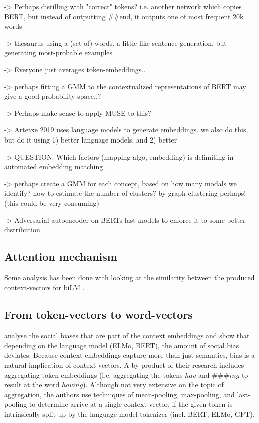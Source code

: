 \documentclass[a4paper,12pt,twoside,openright]{report}
\begin{document}
-> Perhaps distilling with "correct" tokens? i.e. another network which copies BERT, but instead of outputting \#\#end, it outputs one of most frequent 20k words

-> thesaurus using a (set of) words. a little like sentence-generation, but generating most-probable examples

-> Everyone just averages token-embeddings..

-> perhaps fitting a GMM to the contextualized representations of BERT may give a good probability space..?

-> Perhaps make sense to apply MUSE to this?

-> Artetxe 2019 uses language models to generate embeddings. we also do this, but do it using 1) better language models, and 2) better 

-> QUESTION: Which factors (mapping algo, embedding) is delimiting in automated embedding matching

-> perhaps create a GMM for each concept, based on how many modals we identify? how to estimate the number of clusters? by graph-clustering perhaps! (this could be very consuming)

-> Adversarial autoencoder on BERTs last models to enforce it to some better distribution


\subsection{Attention mechanism}

Some analysis has been done with looking at the similarity between the produced context-vectors for biLM \cite{peters18}.

\subsection{From token-vectors to word-vectors}

\cite{may19} analyse the social biases that are part of the context embeddings and show that depending on the language model (ELMo, BERT), the amount of social bias deviates. 
Because context embeddings capture more than just semantics, bias is a natural implication of context vectors.
A by-product of their research includes aggregating token-embeddings (i.e. aggregating the tokens $hav$ and $\#\#\#ing$ to result at the word $having$).
Although not very extensive on the topic of aggregation, the authors  use techniques of mean-pooling, max-pooling, and last-pooling to determine arrive at a single context-vector, if the given token is intrinsically split-up by the language-model tokenizer (incl. BERT, ELMo, GPT).
\end{document}
